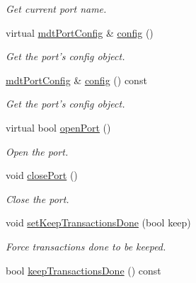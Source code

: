 \begin{DoxyCompactItemize}
\begin{DoxyCompactList}\small\item\em Get current port name. \end{DoxyCompactList}\item 
virtual \hyperlink{classmdt_port_config}{mdtPortConfig} \& \hyperlink{classmdt_port_manager_a9cf3ea2da38f81682695b37448712ffd}{config} ()
\begin{DoxyCompactList}\small\item\em Get the port's config object. \end{DoxyCompactList}\item 
\hyperlink{classmdt_port_config}{mdtPortConfig} \& \hyperlink{classmdt_port_manager_a735b7dc766fc2f45fb2cf9772c4201b0}{config} () const 
\begin{DoxyCompactList}\small\item\em Get the port's config object. \end{DoxyCompactList}\item 
virtual bool \hyperlink{classmdt_port_manager_aab594613e8985590c835194efbc27b5e}{openPort} ()
\begin{DoxyCompactList}\small\item\em Open the port. \end{DoxyCompactList}\item 
void \hyperlink{classmdt_port_manager_ace8065f1f5083041ee7f65c2892bc77d}{closePort} ()
\begin{DoxyCompactList}\small\item\em Close the port. \end{DoxyCompactList}\item 
void \hyperlink{classmdt_port_manager_a9adb5098766c9df588bc9978b00c5eb2}{setKeepTransactionsDone} (bool keep)
\begin{DoxyCompactList}\small\item\em Force transactions done to be keeped. \end{DoxyCompactList}\item 
\hypertarget{classmdt_port_manager_a798ce0939234870ae3b9995108e54380}{
bool \hyperlink{classmdt_port_manager_a798ce0939234870ae3b9995108e54380}{keepTransactionsDone} () const }
\label{classmdt_port_manager_a798ce0939234870ae3b9995108e54380}


\end{DoxyCompactItemize}
